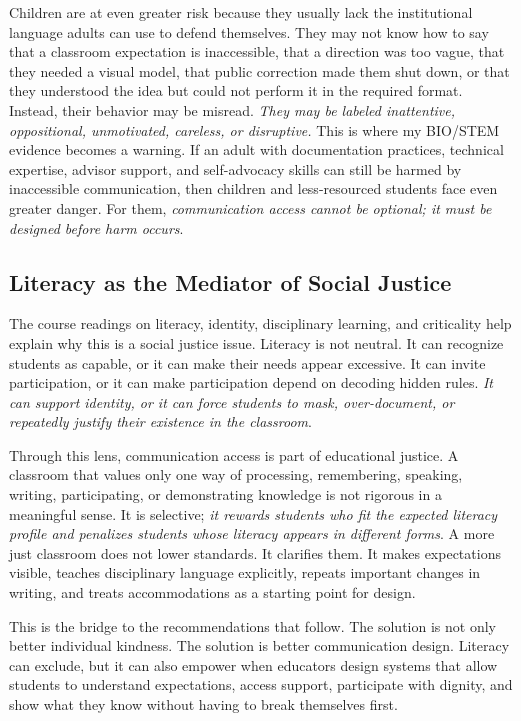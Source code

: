 Children are at even greater risk because they usually lack the institutional language adults can use to defend themselves. They may not know how to say that a classroom expectation is inaccessible, that a direction was too vague, that they needed a visual model, that public correction made them shut down, or that they understood the idea but could not perform it in the required format. Instead, their behavior may be misread. \textit{They may be labeled inattentive, oppositional, unmotivated, careless, or disruptive.} This is where my BIO/STEM evidence becomes a warning. If an adult with documentation practices, technical expertise, advisor support, and self-advocacy skills can still be harmed by inaccessible communication, then children and less-resourced students face even greater danger. For them, \textit{communication access cannot be optional; it must be designed before harm occurs}.

\subsection*{Literacy as the Mediator of Social Justice}

The course readings on literacy, identity, disciplinary learning, and criticality help explain why this is a social justice issue. Literacy is not neutral. It can recognize students as capable, or it can make their needs appear excessive. It can invite participation, or it can make participation depend on decoding hidden rules. \textit{It can support identity, or it can force students to mask, over-document, or repeatedly justify their existence in the classroom}.

Through this lens, communication access is part of educational justice. A classroom that values only one way of processing, remembering, speaking, writing, participating, or demonstrating knowledge is not rigorous in a meaningful sense. It is selective; \textit{it rewards students who fit the expected literacy profile and penalizes students whose literacy appears in different forms}. A more just classroom does not lower standards. It clarifies them. It makes expectations visible, teaches disciplinary language explicitly, repeats important changes in writing, and treats accommodations as a starting point for design.

This is the bridge to the recommendations that follow. The solution is not only better individual kindness. The solution is better communication design. Literacy can exclude, but it can also empower when educators design systems that allow students to understand expectations, access support, participate with dignity, and show what they know without having to break themselves first.

